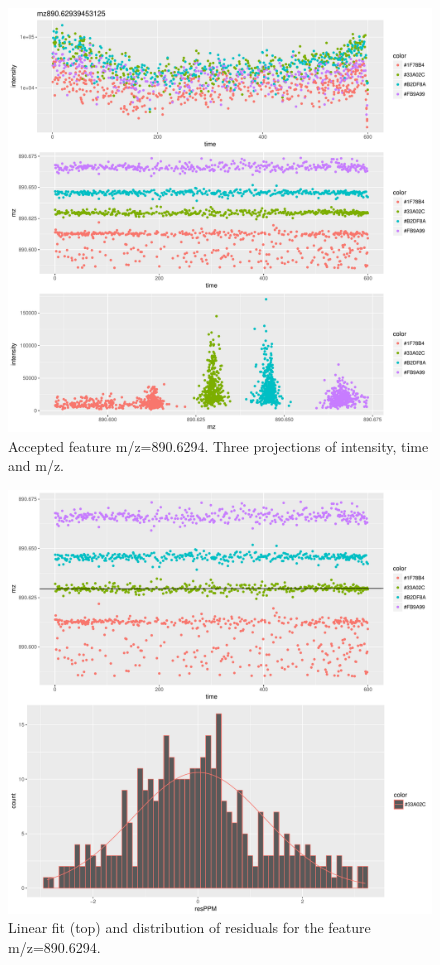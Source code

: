\documentclass[]{article}
\begin{document}
\begin{figure}[H]
\begin{center}
\includegraphics{Supplementary_document_files/figure-latex/cluster.mz.890-1.pdf}
\caption{Accepted feature m/z=890.6294. Three projections of intensity, time and m/z.}
\label{fig:d3.mz.890.6294}
\end{center}
\end{figure}


\begin{figure}[H]
\begin{center}
\includegraphics{Supplementary_document_files/figure-latex/filter.lm.890-1.pdf}
\caption{Linear fit (top) and distribution of residuals for the  feature m/z=890.6294.}
\label{ig:chk.mz.890.6294}
\end{center}
\end{figure}
\end{document}
